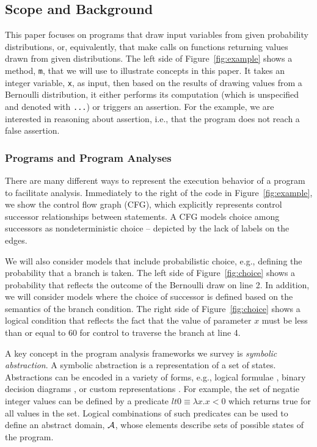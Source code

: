 \subsection{Scope and Background}
\label{sec:background}

This paper focuses on programs that draw input variables
from given probability distributions, or, equivalently, that make
calls on functions returning values drawn from given distributions.
The left side of Figure~\ref{fig:example} shows a method,
\texttt{m}, that we will use to illustrate concepts in this paper.     
It takes an integer variable, \texttt{x}, as input, then based on the 
results of drawing values from a Bernoulli distribution,
it either performs its computation
(which is unspecified and denoted with \texttt{...}) or triggers
an assertion. 
For the example, we are interested in reasoning about
assertion, i.e., that the program does not reach a false assertion.



\subsubsection{Programs and Program Analyses}

There are many different ways to represent the execution behavior
of a program to facilitate analysis.  Immediately to the right of
the code in Figure~\ref{fig:example}, we show the control flow graph (CFG),
which explicitly represents control successor relationships between
statements.  A CFG models choice among successors as nondeterministic
choice -- depicted by the lack of labels on the edges.

We will also consider models that include probabilistic choice,
e.g., defining the probability that a branch is taken.
The left side of Figure~\ref{fig:choice} shows a probability
that reflects the outcome of the Bernoulli draw on line 2.
In addition, we will consider models where the
choice of successor is defined based on the semantics
of the branch condition.
The right side of Figure~\ref{fig:choice} 
shows a logical condition that 
reflects the fact that the value of parameter $x$ must be
less than or equal to $60$ for control to traverse the branch at line 4.



A key concept in the program analysis frameworks we survey is
\textit{symbolic abstraction}.  A symbolic abstraction is a 
representation of a set of states.  Abstractions can be encoded
in a variety of forms, e.g., logical formulae \cite{thakur2012bilateral}, binary
decision diagrams \cite{bryant1992symbolic}, or custom representations \cite{bagnara2008parma}.  For example, the set of negatie integer values 
can be defined by a predicate 
$lt0 \equiv \lambda x.x<0$ which returns true for all values in the set.
Logical combinations of such predicates can be used to define
an abstract domain, ${\cal A}$, whose elements describe sets of
possible states of the program.

